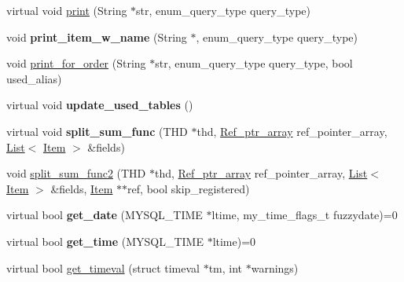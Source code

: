\begin{DoxyCompactItemize}
\item 
virtual void \mbox{\hyperlink{classItem_aa7ba4bde739d83adec8edf3bf1596d94}{print}} (String $\ast$str, enum\+\_\+query\+\_\+type query\+\_\+type)
\item 
\mbox{\label{classItem_a96e64d774c810242c2a521ef12ec5e87}} 
void {\bfseries print\+\_\+item\+\_\+w\+\_\+name} (String $\ast$, enum\+\_\+query\+\_\+type query\+\_\+type)
\item 
void \mbox{\hyperlink{classItem_a57c4fb57ce8c51fcd6b33675930e90ca}{print\+\_\+for\+\_\+order}} (String $\ast$str, enum\+\_\+query\+\_\+type query\+\_\+type, bool used\+\_\+alias)
\item 
\mbox{\label{classItem_aadd2c248fbd750a1f52ba6ad2c7012b0}} 
virtual void {\bfseries update\+\_\+used\+\_\+tables} ()
\item 
\mbox{\label{classItem_ac1beb306adcaeb186cf8e53fcd966388}} 
virtual void {\bfseries split\+\_\+sum\+\_\+func} (T\+HD $\ast$thd, \mbox{\hyperlink{classBounds__checked__array}{Ref\+\_\+ptr\+\_\+array}} ref\+\_\+pointer\+\_\+array, \mbox{\hyperlink{classList}{List}}$<$ \mbox{\hyperlink{classItem}{Item}} $>$ \&fields)
\item 
void \mbox{\hyperlink{classItem_a17732157754b75692c499089e9c7945c}{split\+\_\+sum\+\_\+func2}} (T\+HD $\ast$thd, \mbox{\hyperlink{classBounds__checked__array}{Ref\+\_\+ptr\+\_\+array}} ref\+\_\+pointer\+\_\+array, \mbox{\hyperlink{classList}{List}}$<$ \mbox{\hyperlink{classItem}{Item}} $>$ \&fields, \mbox{\hyperlink{classItem}{Item}} $\ast$$\ast$ref, bool skip\+\_\+registered)
\item 
\mbox{\label{classItem_aa3b1a49c95451ca4f42e3708625ce997}} 
virtual bool {\bfseries get\+\_\+date} (M\+Y\+S\+Q\+L\+\_\+\+T\+I\+ME $\ast$ltime, my\+\_\+time\+\_\+flags\+\_\+t fuzzydate)=0
\item 
\mbox{\label{classItem_a27ee6319d3922b06f0bc86da72ed1354}} 
virtual bool {\bfseries get\+\_\+time} (M\+Y\+S\+Q\+L\+\_\+\+T\+I\+ME $\ast$ltime)=0
\item 
virtual bool \mbox{\hyperlink{classItem_aa04fbf99d5b417b78536362654daff73}{get\+\_\+timeval}} (struct timeval $\ast$tm, int $\ast$warnings)
\item 
\mbox{\label{classItem_a10381afc72e70da129cf71aa66938b0c}} 
$$
\end{DoxyCompactItemize}
